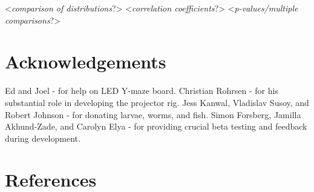 \documentclass[10pt]{article}
\begin{document}
\begin{multicols}{2}
<\textit{comparison of distributions}?>
<\textit{correlation coefficients}?>
<\textit{p-values/multiple comparisons}?>

\section*{Acknowledgements}

Ed and Joel - for help on LED Y-maze board.
Christian Rohrsen - for his substantial role in developing the projector rig.
Jess Kanwal, Vladislav Susoy, and Robert Johnson - for donating larvae, worms, and fish.
Simon Forsberg, Jamilla Akhund-Zade, and Carolyn Elya - for providing crucial beta testing and feedback during development.

\end{multicols}

\section*{References}
\end{document}
